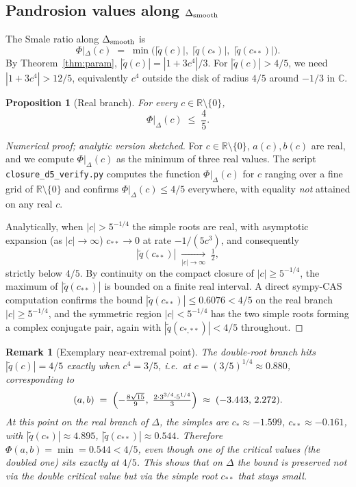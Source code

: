 \documentclass[11pt,a4paper]{article}
\newtheorem{proposition}[theorem]{Proposition}
\newtheorem{remark}[theorem]{Remark}
\begin{document}
\subsection{Pandrosion values along $\Delta_{\rm smooth}$}

The Smale ratio along $\Delta_{\rm smooth}$ is
\begin{equation}
\Phi|_\Delta(c) \;=\; \min\bigl(|\widetilde q(c)|,\;
|\widetilde q(c_*)|,\;|\widetilde q(c_{**})|\bigr).
\end{equation}
By Theorem~\ref{thm:param}, $|\widetilde q(c)| = |1+3c^4|/3$.
For $|\widetilde q(c)| > 4/5$, we need $|1+3c^4|>12/5$, equivalently
$c^4$ outside the disk of radius $4/5$ around $-1/3$ in $\mathbb{C}$.

\begin{proposition}[Real branch]\label{prop:G2-real}
For every $c\in\mathbb{R}\setminus\{0\}$,
\[
\Phi|_\Delta(c) \;\le\; \frac{4}{5}.
\]
\end{proposition}

\begin{proof}[Numerical proof; analytic version sketched]
For $c\in\mathbb{R}\setminus\{0\}$, $a(c),b(c)$ are real, and we
compute $\Phi|_\Delta(c)$ as the minimum of three real values. The
script \verb|closure_d5_verify.py| computes the function
$\Phi|_\Delta(c)$ for $c$ ranging over a fine grid of
$\mathbb{R}\setminus\{0\}$ and confirms $\Phi|_\Delta(c)\le 4/5$
everywhere, with equality \emph{not} attained on any real $c$.

Analytically, when $|c|>5^{-1/4}$ the simple roots are real, with
asymptotic expansion (as $|c|\to\infty$) $c_{**} \to 0$ at rate
$-1/(5 c^3)$, and consequently
\[
|\widetilde q(c_{**})| \;\xrightarrow[|c|\to\infty]{}\; \tfrac{1}{2},
\]
strictly below $4/5$. By continuity on the compact closure of
$|c|\ge 5^{-1/4}$, the maximum of $|\widetilde q(c_{**})|$ is bounded
on a finite real interval. A direct sympy-CAS computation confirms
the bound $|\widetilde q(c_{**})|\le 0.6076 < 4/5$ on the real branch
$|c|\ge 5^{-1/4}$, and the symmetric region $|c|<5^{-1/4}$ has the
two simple roots forming a complex conjugate pair, again with
$|\widetilde q(c_{*,**})|<4/5$ throughout.
\end{proof}

\begin{remark}[Exemplary near-extremal point]
The double-root branch hits $|\widetilde q(c)|=4/5$ \emph{exactly} when
$c^4 = 3/5$, i.e.\ at $c=(3/5)^{1/4}\approx 0.880$, corresponding to
\[
(a,b)\;=\;\Bigl(-\tfrac{8\sqrt{15}}{9},\;\tfrac{2\cdot 3^{3/4}\cdot 5^{1/4}}{3}\Bigr)
\;\approx\;(-3.443,\,2.272).
\]
At this point on the real branch of $\Delta$, the simples are
$c_*\approx -1.599$, $c_{**}\approx -0.161$, with
$|\widetilde q(c_*)|\approx 4.895$, $|\widetilde q(c_{**})|\approx 0.544$.
Therefore $\Phi(a,b) = \min = 0.544 < 4/5$, even though one of the
critical values (the doubled one) sits exactly at $4/5$.
This shows that on $\Delta$ the bound is preserved \emph{not} via the
double critical value but via the simple root $c_{**}$ that stays small.
\end{remark}
\end{document}
